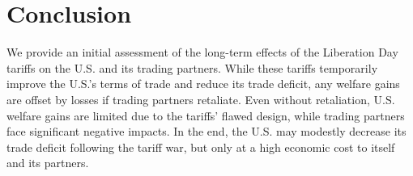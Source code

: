 \documentclass[12pt]{article}
\begin{document}
\section{Conclusion}

We provide an initial assessment of the long-term effects of the Liberation Day tariffs on the U.S. and its trading partners. While these tariffs temporarily improve the U.S.'s terms of trade and reduce its trade deficit, any welfare gains are offset by losses if trading partners retaliate. Even without retaliation, U.S. welfare gains are limited due to the tariffs' flawed design, while trading partners face significant negative impacts. In the end, the U.S. may modestly decrease its trade deficit following the tariff war, but only at a high economic cost to itself and its partners.



\end{document}

